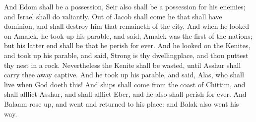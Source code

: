 \begin{biblechapter}
\verse And Edom shall be a possession, Seir also shall be a possession for his enemies; and Israel shall do valiantly.
\verse Out of Jacob shall come he that shall have dominion, and shall destroy him that remaineth of the city.
 And when he looked on Amalek, he took up his parable, and said, Amalek was the first of the nations; but his latter end shall be that he perish for ever.
 And he looked on the Kenites, and took up his parable, and said, Strong is thy dwellingplace, and thou puttest thy nest in a rock.
\verse Nevertheless the Kenite shall be wasted, until Asshur shall carry thee away captive.
 And he took up his parable, and said, Alas, who shall live when God doeth this!
\verse And ships shall come from the coast of Chittim, and shall afflict Asshur, and shall afflict Eber, and he also shall perish for ever.
\verse And Balaam rose up, and went and returned to his place: and Balak also went his way.
\end{biblechapter}

